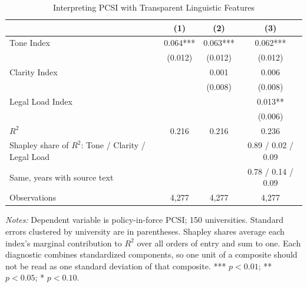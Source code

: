 \begin{table}[htbp]
\centering
\small
\caption{Interpreting PCSI with Transparent Linguistic Features}
\label{tab:linguistic}
\begin{threeparttable}
\begin{tabular}{lccc}
\toprule
 & (1) & (2) & (3) \\
\midrule
Tone Index & 0.064*** & 0.063*** & 0.062*** \\
 & (0.012) & (0.012) & (0.012) \\
Clarity Index &  & 0.001 & 0.006 \\
 &  & (0.008) & (0.008) \\
Legal Load Index &  &  & 0.013** \\
 &  &  & (0.006) \\
\midrule
$R^2$ & 0.216 & 0.216 & 0.236 \\
Shapley share of $R^2$: Tone / Clarity / Legal Load & & & 0.89 / 0.02 / 0.09 \\
\quad Same, years with source text & & & 0.78 / 0.14 / 0.09 \\
Observations & 4,277 & 4,277 & 4,277 \\
\bottomrule
\end{tabular}
\begin{tablenotes}[flushleft]\footnotesize
\item \textit{Notes:} Dependent variable is policy-in-force PCSI; 150 universities. Standard errors clustered by university are in parentheses. Shapley shares average each index's marginal contribution to $R^2$ over all orders of entry and sum to one. Each diagnostic combines standardized components, so one unit of a composite should not be read as one standard deviation of that composite. *** $p<0.01$; ** $p<0.05$; * $p<0.10$.
\end{tablenotes}
\end{threeparttable}
\end{table}
